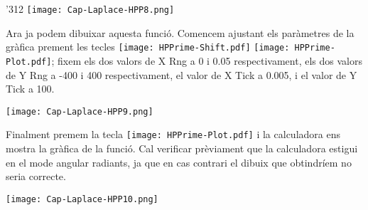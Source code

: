 \begin{exemple}
\begin{dingautolist}{'312}
            \texttt{[image: Cap-Laplace-HPP8.png]}\vspace{5mm}

          \item Ara ja podem dibuixar aquesta funció. Comencem ajustant els paràmetres de la gràfica prement les tecles \texttt{[image: HPPrime-Shift.pdf]} \texttt{[image: HPPrime-Plot.pdf]}; fixem els dos valors de \textsf{X Rng} a \textsf{0} i \textsf{0.05} respectivament, els dos valors de \textsf{Y Rng} a \textsf{-400} i \textsf{400} respectivament, el valor de \textsf{X Tick} a \textsf{0.005}, i el valor de \textsf{Y Tick} a \textsf{100}.

            \texttt{[image: Cap-Laplace-HPP9.png]}\vspace{5mm}

          \item Finalment premem la tecla \texttt{[image: HPPrime-Plot.pdf]} i la calculadora ens mostra la gràfica de la funció. Cal verificar prèviament que la calculadora estigui en el mode angular radiants, ja que en cas contrari el dibuix que obtindríem no seria correcte.

            \texttt{[image: Cap-Laplace-HPP10.png]}

    \end{dingautolist}

\end{exemple}
